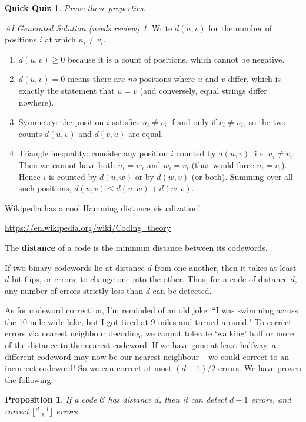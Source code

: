 \documentclass{article}
\theoremstyle{plain}
\newtheorem{proposition}[theorem]{Proposition}
\newtheorem{quiz}[theorem]{Quick Quiz}
\theoremstyle{definition}
\theoremstyle{remark}
\newtheorem*{aisolution}{AI Generated Solution (needs review)}
\numberwithin{theorem}{section}
\begin{document}
\begin{quiz}
    Prove these properties.
\end{quiz}
\begin{aisolution}
Write $d(u,v)$ for the number of positions $i$ at which $u_i \neq v_i$.
\begin{enumerate}
\item $d(u,v) \geq 0$ because it is a count of positions, which cannot be negative.
\item $d(u,v) = 0$ means there are \emph{no} positions where $u$ and $v$ differ, which is exactly the statement that $u = v$ (and conversely, equal strings differ nowhere).
\item Symmetry: the position $i$ satisfies $u_i \neq v_i$ if and only if $v_i \neq u_i$, so the two counts $d(u,v)$ and $d(v,u)$ are equal.
\item Triangle inequality: consider any position $i$ counted by $d(u,v)$, i.e. $u_i \neq v_i$.  Then we cannot have both $u_i = w_i$ and $w_i = v_i$ (that would force $u_i = v_i$).  Hence $i$ is counted by $d(u,w)$ or by $d(w,v)$ (or both).  Summing over all such positions, $d(u,v) \leq d(u,w) + d(w,v)$.
\end{enumerate}
\end{aisolution}

Wikipedia has a cool Hamming distance visualization!

\url{https://en.wikipedia.org/wiki/Coding_theory}

The \textbf{distance} of a code is the minimum distance between its codewords.

If two binary codewords lie at distance $d$ from one another, then it takes at least $d$ bit flips, or errors, to change one into the other.  Thus, for a code of distance $d$, any number of errors strictly less than $d$ can be detected.

As for codeword correction, I'm reminded of an old joke:  ``I was swimming across the 10 mile wide lake, but I got tired at 9 miles and turned around."  To correct errors via nearest neighbour decoding, we cannot tolerate `walking' half or more of the distance to the nearest codeword.  If we have gone at least halfway, a different codeword may now be our nearest neighbour -- we could correct to an incorrect codeword!  So we can correct at most $(d-1)/2$ errors.  We have proven the following.

\begin{proposition}
    If a code $\mathcal{C}$ has distance $d$, then it can detect $d-1$ errors, and correct $\lfloor \frac{d-1}{2} \rfloor$ errors.
\end{proposition}
\end{document}
